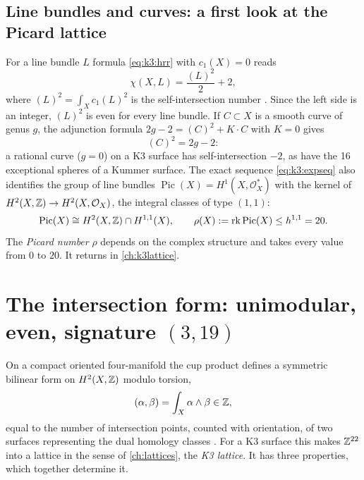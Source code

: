 \subsection{Line bundles and curves: a first look at the Picard lattice}

For a line bundle $L$ formula \eqref{eq:k3:hrr} with $c_1(X)=0$ reads
\begin{equation}\label{eq:k3:rrline}
  \chi(X,L)=\frac{(L)^2}{2}+2,
\end{equation}
where $(L)^2=\int_Xc_1(L)^2$ is the self-intersection number . Since the left side is an integer, $(L)^2$ is even for every line
bundle. If $C\subset X$ is a smooth curve of genus $g$, the adjunction formula
$2g-2=(C)^2+K\cdot C$ with $K=0$ gives
\begin{equation}
  (C)^2=2g-2 :
\end{equation}
a rational curve ($g=0$) on a K3 surface has self-intersection $-2$, as have
the 16 exceptional spheres of a Kummer surface. The exact sequence \eqref{eq:k3:expseq} also
identifies the group of line bundles $\operatorname{Pic}(X)=H^1(X,\mathcal{O}_X^*)$ with the
kernel of $H^2(X,\mathbb{Z})\to H^2(X,\mathcal{O}_X)$, the integral classes of type $(1,1)$:
\begin{equation}\label{eq:k3:picard}
  \operatorname{Pic}(X)\cong H^2(X,\mathbb{Z})\cap H^{1,1}(X),\qquad
  \rho(X):=\operatorname{rk}\operatorname{Pic}(X)\le h^{1,1}=20 .
\end{equation}
 The \emph{Picard
number} $\rho$ depends on the complex structure and takes every value
from $0$ to $20$. \TL{} It returns in \cref{ch:k3lattice}.

\section{The intersection form: unimodular, even, signature \texorpdfstring{$(3,19)$}{(3,19)}}
\label{sec:k3:signature}

On a compact oriented four-manifold the cup product defines a symmetric bilinear form on
$H^2(X,\mathbb{Z})$ modulo torsion,
\begin{equation}
  (\alpha,\beta)=\int_X\alpha\wedge\beta\in\mathbb{Z} ,
\end{equation}
equal to the number of intersection points, counted with orientation, of two surfaces
representing the dual homology classes . For a K3
surface this makes $\mathbb{Z}^{22}$ into a lattice in the sense of \cref{ch:lattices}, the
\emph{K3 lattice}. It has three properties, which together determine it.

